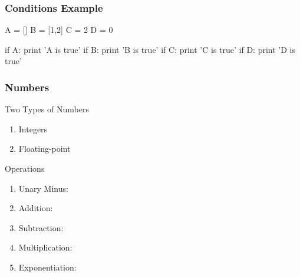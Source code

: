 \begin{frame}[fragile]
\frametitle{Conditions Example}

\begin{python}
A = []
B = [1,2]
C = 2
D = 0

if A:
    print 'A is true'
if B:
    print 'B is true'
if C:
    print 'C is true'
if D:
    print 'D is true'
\end{python}
\end{frame}

\begin{frame}[fragile]
\frametitle{Numbers}
\begin{block}{Two Types of Numbers}
\begin{enumerate}
\item Integers
\item Floating-point
\end{enumerate}
\end{block}

\begin{block}{Operations}
\begin{enumerate}
\item Unary Minus: 
\item Addition: 
\item Subtraction: 
\item Multiplication: 
\item Exponentiation: 
\end{enumerate}
\end{block}
\end{frame}

